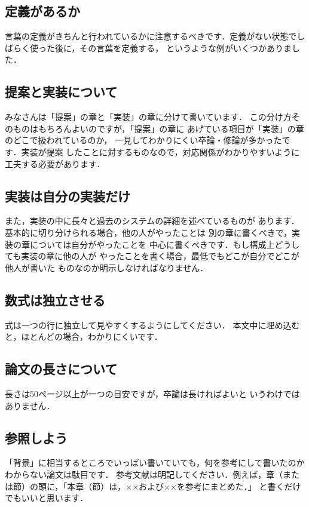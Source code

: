 \subsection{定義があるか}
言葉の定義がきちんと行われているかに注意するべきです．定義がない状態でしばらく使った後に，その言葉を定義する，
というような例がいくつかありました．

\subsection{提案と実装について}
みなさんは「提案」の章と「実装」の章に分けて書いています．
この分け方そのものはもちろんよいのですが，「提案」の章に
あげている項目が「実装」の章のどこで扱われているのか，
一見してわかりにくい卒論・修論が多かったです．実装が提案
したことに対するものなので，対応関係がわかりやすいように
工夫する必要があります．

\subsection{実装は自分の実装だけ}
また，実装の中に長々と過去のシステムの詳細を述べているものが
あります．基本的に切り分けられる場合，他の人がやったことは
別の章に書くべきで，実装の章については自分がやったことを
中心に書くべきです．もし構成上どうしても実装の章に他の人が
やったことを書く場合，最低でもどこが自分でどこが他人が書いた
ものなのか明示しなければなりません．

\subsection{数式は独立させる}
式は一つの行に独立して見やすくするようにしてください．
本文中に埋め込むと，ほとんどの場合，わかりにくいです．

\subsection{論文の長さについて}
長さは50ページ以上が一つの目安ですが，卒論は長ければよいと
いうわけではありません．

\subsection{参照しよう}
「背景」に相当するところでいっぱい書いていても，何を参考にして書いたのかわからない論文は駄目です．
参考文献は明記してください．例えば，章（または節）の頭に，「本章（節）は，××および××を参考にまとめた．」
と書くだけでもいいと思います．

